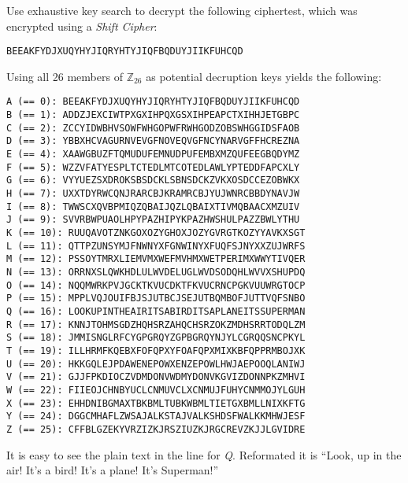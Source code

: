 \begin{statement}{1.5}
  Use exhaustive key search to decrypt the following ciphertest, which was encrypted using a {\em Shift Cipher}:
\begin{center}
\texttt{BEEAKFYDJXUQYHYJIQRYHTYJIQFBQDUYJIIKFUHCQD}
\end{center}
\end{statement}

Using all 26 members of $\mathbb{Z}_{26}$ as potential decruption keys yields the following:

\begin{center}
\texttt{A (==  0): BEEAKFYDJXUQYHYJIQRYHTYJIQFBQDUYJIIKFUHCQD \\
B (==  1): ADDZJEXCIWTPXGXIHPQXGSXIHPEAPCTXIHHJETGBPC \\
C (==  2): ZCCYIDWBHVSOWFWHGOPWFRWHGODZOBSWHGGIDSFAOB \\
D (==  3): YBBXHCVAGURNVEVGFNOVEQVGFNCYNARVGFFHCREZNA \\
E (==  4): XAAWGBUZFTQMUDUFEMNUDPUFEMBXMZQUFEEGBQDYMZ \\
F (==  5): WZZVFATYESPLTCTEDLMTCOTEDLAWLYPTEDDFAPCXLY \\
G (==  6): VYYUEZSXDROKSBSDCKLSBNSDCKZVKXOSDCCEZOBWKX \\
H (==  7): UXXTDYRWCQNJRARCBJKRAMRCBJYUJWNRCBBDYNAVJW \\
I (==  8): TWWSCXQVBPMIQZQBAIJQZLQBAIXTIVMQBAACXMZUIV \\
J (==  9): SVVRBWPUAOLHPYPAZHIPYKPAZHWSHULPAZZBWLYTHU \\
K (== 10): RUUQAVOTZNKGOXOZYGHOXJOZYGVRGTKOZYYAVKXSGT \\
L (== 11): QTTPZUNSYMJFNWNYXFGNWINYXFUQFSJNYXXZUJWRFS \\
M (== 12): PSSOYTMRXLIEMVMXWEFMVHMXWETPERIMXWWYTIVQER \\
N (== 13): ORRNXSLQWKHDLULWVDELUGLWVDSODQHLWVVXSHUPDQ \\
O (== 14): NQQMWRKPVJGCKTKVUCDKTFKVUCRNCPGKVUUWRGTOCP \\
P (== 15): MPPLVQJOUIFBJSJUTBCJSEJUTBQMBOFJUTTVQFSNBO \\
Q (== 16): LOOKUPINTHEAIRITSABIRDITSAPLANEITSSUPERMAN \\
R (== 17): KNNJTOHMSGDZHQHSRZAHQCHSRZOKZMDHSRRTODQLZM \\
S (== 18): JMMISNGLRFCYGPGRQYZGPBGRQYNJYLCGRQQSNCPKYL \\
T (== 19): ILLHRMFKQEBXFOFQPXYFOAFQPXMIXKBFQPPRMBOJXK \\
U (== 20): HKKGQLEJPDAWENEPOWXENZEPOWLHWJAEPOOQLANIWJ \\
V (== 21): GJJFPKDIOCZVDMDONVWDMYDONVKGVIZDONNPKZMHVI \\
W (== 22): FIIEOJCHNBYUCLCNMUVCLXCNMUJFUHYCNMMOJYLGUH \\
X (== 23): EHHDNIBGMAXTBKBMLTUBKWBMLTIETGXBMLLNIXKFTG \\
Y (== 24): DGGCMHAFLZWSAJALKSTAJVALKSHDSFWALKKMHWJESF \\
Z (== 25): CFFBLGZEKYVRZIZKJRSZIUZKJRGCREVZKJJLGVIDRE }
\end{center}
It is easy to see the plain text in the line for \textsl{Q}. Reformated it is ``Look, up in the air! It's a bird! It's a plane! It's Superman!''



